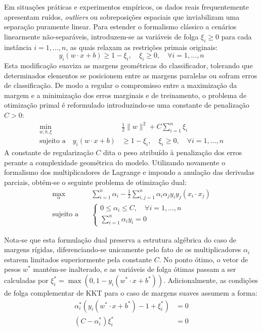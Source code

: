 \documentclass[12pt, a4paper]{article}
\theoremstyle{plain}
\theoremstyle{definition}
\theoremstyle{remark}
\newcommand{\ident}{\hspace{2em}}
\begin{document}
\ident Em situações práticas e experimentos empíricos, os dados reais frequentemente apresentam ruídos, \textit{outliers} ou sobreposições espaciais que inviabilizam uma separação puramente linear. Para estender o formalismo clássico a cenários linearmente não-separáveis, introduzem-se as variáveis de folga $\xi_i \geq 0$ para cada instância $i = 1, \dots, n$, as quais relaxam as restrições primais originais:
\begin{equation*}
    y_i \left(w \cdot x + b \right) \geq 1 - \xi_i, \quad \xi_i \geq 0, \quad \forall i = 1, \dots, n
\end{equation*}
\ident Esta modificação suaviza as margens geométricas do classificador, tolerando que determinados elementos se posicionem entre as margens paralelas ou sofram erros de classificação. De modo a regular o compromisso entre a maximização da margem e a minimização dos erros marginais e de treinamento, o problema de otimização primal é reformulado introduzindo-se uma constante de penalização $C > 0$:
\begin{align*}
    \min_{w, b, \xi} \quad & \frac{1}{2} \|w\|^2 + C \sum_{i=1}^{n} \xi_i \\[0.5cm]
    \text{sujeito a} \quad  y_i \left(w \cdot x + b \right) &\geq 1 - \xi_i, \quad \xi_i \geq 0, \quad \forall i = 1, \dots, n \nonumber
\end{align*}
\ident A constante de regularização $C$ dita o peso atribuído à penalização dos erros perante a complexidade geométrica do modelo. Utilizando novamente o formalismo dos multiplicadores de Lagrange e impondo a anulação das derivadas parciais, obtém-se o seguinte problema de otimização dual:
\begin{align*}
    \max_{\alpha} \quad & \sum_{i=1}^{n} \alpha_i - \frac{1}{2} \sum_{i,j=1}^{n} \alpha_i \alpha_j y_i y_j  \left(x_i \cdot x_j\right) \\[0.5cm]
    \text{sujeito a} \quad & \begin{cases}
        0 \leq \alpha_i \leq C, \quad \forall i = 1, \dots, n \nonumber \\
         \sum_{i=1}^{n} \alpha_i y_i = 0 \nonumber
    \end{cases} 
\end{align*}

\ident Nota-se que esta formulação dual preserva a estrutura algébrica do caso de margens rígidas, diferenciando-se unicamente pelo fato de os multiplicadores $\alpha_i$ estarem limitados superiormente pela constante $C$. No ponto ótimo, o vetor de pesos $w^*$ mantém-se inalterado, e as variáveis de folga ótimas passam a ser calculadas por $\xi_i^* = \max \left(0, 1 - y_i \left( w^* \cdot x + b^* \right) \right)$. Adicionalmente, as condições de folga complementar de KKT para o caso de margens suaves assumem a forma:
\begin{align*}
    \alpha_i^* \left( y_i \left( w^* \cdot x + b^* \right) - 1 + \xi_i^* \right) &= 0 \\
    \left( C - \alpha_i^* \right) \xi_i^* &= 0
\end{align*}
\end{document}
